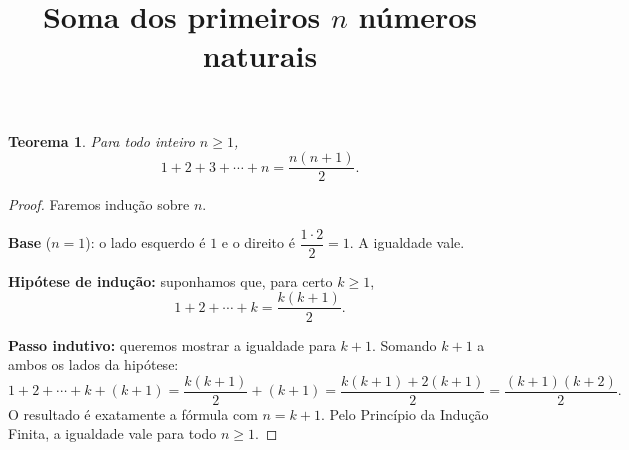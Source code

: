 \documentclass[12pt,a4paper]{article}
\title{Soma dos primeiros $n$ números naturais}
\author{}
\date{}
\newtheorem{theorem}{Teorema}[section]
\begin{document}
\maketitle

\begin{theorem}
Para todo inteiro $n \geq 1$,
\[
  1 + 2 + 3 + \cdots + n = \frac{n(n+1)}{2}.
\]
\end{theorem}

\begin{proof}
Faremos indução sobre $n$.

\textbf{Base} ($n=1$): o lado esquerdo é $1$ e o direito é
$\dfrac{1\cdot 2}{2} = 1$. A igualdade vale.

\textbf{Hipótese de indução:} suponhamos que, para certo $k \geq 1$,
\[
  1 + 2 + \cdots + k = \frac{k(k+1)}{2}.
\]

\textbf{Passo indutivo:} queremos mostrar a igualdade para $k+1$.
Somando $k+1$ a ambos os lados da hipótese:
\[
  1 + 2 + \cdots + k + (k+1)
  = \frac{k(k+1)}{2} + (k+1)
  = \frac{k(k+1) + 2(k+1)}{2}
  = \frac{(k+1)(k+2)}{2}.
\]
O resultado é exatamente a fórmula com $n = k+1$. Pelo Princípio da
Indução Finita, a igualdade vale para todo $n \geq 1$.
\end{proof}
\end{document}

